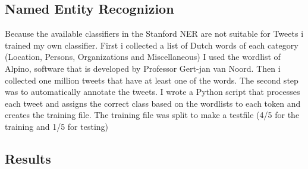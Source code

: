 \documentclass[
10pt, %
a4paper, %
oneside, %
headinclude,footinclude, %
BCOR5mm, %
]{scrartcl}
\begin{document}
\subsection{Named Entity Recognizion}
Because the available classifiers in the Stanford NER are not suitable for Tweets i trained my own classifier. First i collected a list of Dutch words of each category (Location, Persons, Organizations and Miscellaneous) I used the wordlist of Alpino,  software that is developed by Professor Gert-jan van Noord. Then i collected one million tweets that have at least one of the words. The second step was to automatically annotate the tweets. I wrote a Python script that processes each tweet and assigns the correct class based on the wordlists to each token and creates the training file. The training file was split to make a testfile (4/5 for the training and 1/5 for testing)


\newpage
\subsection{Results}
\end{document}
